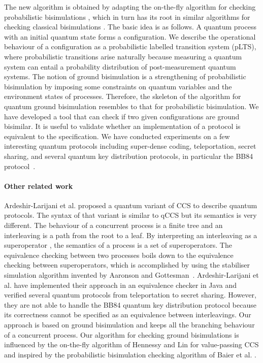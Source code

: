 \documentclass[runningheads]{llncs}
\begin{document}
The new algorithm is obtained by adapting the on-the-fly algorithm for checking probabilistic bisimulations \cite{Deng15}, which in turn has its root in similar algorithms
for checking classical bisimulations \cite{FM90,HL95}. The basic idea is as follows. A quantum process with an initial quantum state forms a configuration. We describe the operational behaviour of a configuration as a probabilistic labelled transition system (pLTS), where probabilistic transitions arise naturally because measuring a quantum system can entail a probability distribution of post-measurement quantum systems. The notion of ground bisimulation is a strengthening of probabilistic bisimulation by imposing some constraints on quantum variables and the environment states of processes. Therefore, the skeleton of the algorithm for quantum ground bisimulation resembles to that for probabilistic bisimulation.
We have developed a tool that can check if two given configurations are ground bisimilar. It is useful to validate whether an implementation of a protocol is equivalent to the specification. We have conducted experiments on a few interesting quantum protocols including super-dense coding, teleportation, secret sharing, and several quantum key distribution protocols, in particular the BB84 protocol~\cite{BB84}.

\paragraph{Other related work} 
 Ardeshir-Larijani et al. \cite{AL18} proposed a quantum variant of CCS to describe quantum protocols. The syntax of that variant is similar to qCCS but its semantics is very different. The behaviour of a concurrent process is a finite tree and an interleaving is a path from the root to a leaf. By interpreting an interleaving as a superoperator \cite{Sel04}, the semantics of a process is a set of superoperators. The equivalence checking between two processes boils down to the equivalence checking between superoperators, which is accomplished by using the stabiliser simulation algorithm invented by Aaronson and Gottesman~\cite{AG04}. Ardeshir-Larijani et al. have implemented their approach in an equivalence checker in Java and verified several quantum protocols from teleportation to secret sharing. 
However, they are not able to handle the BB84 quantum key distribution protocol because its correctness cannot be specified as an equivalence between interleavings.
Our approach is based on ground bisimulation and keeps all the branching behaviour of a concurrent process. Our algorithm for checking ground bisimulations is influenced by the on-the-fly algorithm of Hennessy and Lin for value-passing CCS \cite{HL95} and inspired by the probabilistic bisimulation checking algorithm of Baier et al. \cite{BEM00}.
\end{document}
